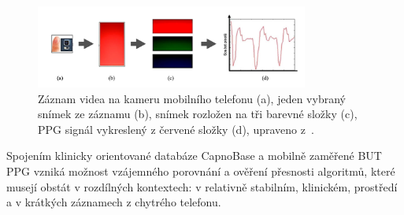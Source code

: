\begin{figure}[ht]
	\centering
	\includegraphics[width=0.8\textwidth]{./obrazky/videoZaznamPPG.png}
	\caption[Získání PPG signálu pro databázi \acs{BUT PPG}]{Záznam videa na kameru mobilního telefonu (a), jeden vybraný snímek ze záznamu (b), snímek rozložen na tři barevné složky (c), PPG signál vykreslený z červené složky (d), upraveno z~\cite{Siddiqui2016}.}
	\label{fig:videoZaznamPPG}
\end{figure}

Spojením klinicky orientované databáze CapnoBase a mobilně zaměřené \acs{BUT PPG} vzniká možnost vzájemného porovnání a ověření přesnosti algoritmů, které musejí obstát v rozdílných kontextech: v relativně stabilním, klinickém, prostředí a v krátkých záznamech z chytrého telefonu.